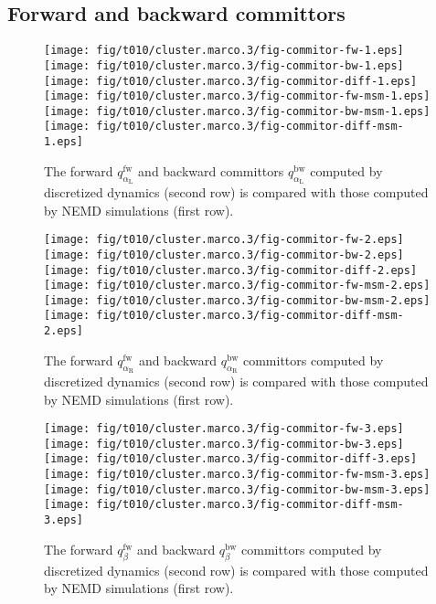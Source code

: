 \documentclass[aps, pre, preprint,unsortedaddress,a4paper,onecolumn]{revtex4}
\newcommand{\fwd}[0]{\textrm{fw}}
\newcommand{\bwd}[0]{\textrm{bw}}
\newcommand{\confaa}[0]{{\alpha_{\textrm{R}}}}
\newcommand{\confc}[0]{{\alpha_{\textrm{L}}}}
\begin{document}
\subsection{Forward and backward committors}
\label{sec:alanine-committor}
\begin{figure}
  \centering
  \texttt{[image: fig/t010/cluster.marco.3/fig-commitor-fw-1.eps]}
  \texttt{[image: fig/t010/cluster.marco.3/fig-commitor-bw-1.eps]}
  \texttt{[image: fig/t010/cluster.marco.3/fig-commitor-diff-1.eps]}\\
  \texttt{[image: fig/t010/cluster.marco.3/fig-commitor-fw-msm-1.eps]}
  \texttt{[image: fig/t010/cluster.marco.3/fig-commitor-bw-msm-1.eps]}
  \texttt{[image: fig/t010/cluster.marco.3/fig-commitor-diff-msm-1.eps]}
  \caption{The forward $q^\fwd_{\confc}$ and backward committors
    $q^\bwd_{\confc}$ computed by discretized dynamics (second row) is compared with
    those computed by NEMD simulations (first
    row).}
  \label{fig:num-3}
\end{figure}

\begin{figure}
  \centering
  \texttt{[image: fig/t010/cluster.marco.3/fig-commitor-fw-2.eps]}
  \texttt{[image: fig/t010/cluster.marco.3/fig-commitor-bw-2.eps]}
  \texttt{[image: fig/t010/cluster.marco.3/fig-commitor-diff-2.eps]}\\
  \texttt{[image: fig/t010/cluster.marco.3/fig-commitor-fw-msm-2.eps]}
  \texttt{[image: fig/t010/cluster.marco.3/fig-commitor-bw-msm-2.eps]}
  \texttt{[image: fig/t010/cluster.marco.3/fig-commitor-diff-msm-2.eps]}
  \caption{The forward $q^\fwd_{\confaa}$ and backward
    $q^\bwd_{\confaa}$ committors computed by discretized dynamics (second row) is
    compared with those computed by NEMD
    simulations (first row).}
  \label{fig:num-4}
\end{figure}

\begin{figure}
  \centering
  \texttt{[image: fig/t010/cluster.marco.3/fig-commitor-fw-3.eps]}
  \texttt{[image: fig/t010/cluster.marco.3/fig-commitor-bw-3.eps]}
  \texttt{[image: fig/t010/cluster.marco.3/fig-commitor-diff-3.eps]}\\
  \texttt{[image: fig/t010/cluster.marco.3/fig-commitor-fw-msm-3.eps]}
  \texttt{[image: fig/t010/cluster.marco.3/fig-commitor-bw-msm-3.eps]}
  \texttt{[image: fig/t010/cluster.marco.3/fig-commitor-diff-msm-3.eps]}
  \caption{The forward $q^\fwd_{\beta}$ and backward $q^\bwd_{\beta}$
    committors computed by discretized dynamics (second row) is
    compared with those computed by NEMD
    simulations (first row).}
  \label{fig:num-5}
\end{figure}
\end{document}
